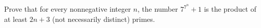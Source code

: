 Prove that for every nonnegative integer $n$,  the number $7^{7^{n}}+1$ is the product of at least $2n+3$ (not necessarily distinct) primes.
